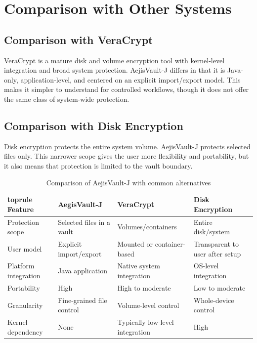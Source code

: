 \documentclass[12pt,a4paper]{report}
\newcommand{\projname}{AejisVault-J}
\begin{document}
\chapter{Comparison with Other Systems}
\section{Comparison with VeraCrypt}
VeraCrypt is a mature disk and volume encryption tool with kernel-level integration and broad system protection. \projname{} differs in that it is Java-only, application-level, and centered on an explicit import/export model. This makes it simpler to understand for controlled workflows, though it does not offer the same class of system-wide protection.

\section{Comparison with Disk Encryption}
Disk encryption protects the entire system volume. \projname{} protects selected files only. This narrower scope gives the user more flexibility and portability, but it also means that protection is limited to the vault boundary.

\begin{table}[H]
\centering
\caption{Comparison of \projname{} with common alternatives}
\begin{tabular}{p{} p{} p{} p{}}
\csname toprule\endcsname
{\bfseries Feature} & {\bfseries AegisVault-J} & {\bfseries VeraCrypt} & {\bfseries Disk Encryption} \\
\midrule
Protection scope & Selected files in a vault & Volumes/containers & Entire disk/system \\
User model & Explicit import/export & Mounted or container-based & Transparent to user after setup \\
Platform integration & Java application & Native system integration & OS-level integration \\
Portability & High & High to moderate & Low to moderate \\
Granularity & Fine-grained file control & Volume-level control & Whole-device control \\
Kernel dependency & None & Typically low-level integration & High \\
\bottomrule
\end{tabular}
\label{tab:comparison}
\end{table}
\end{document}
